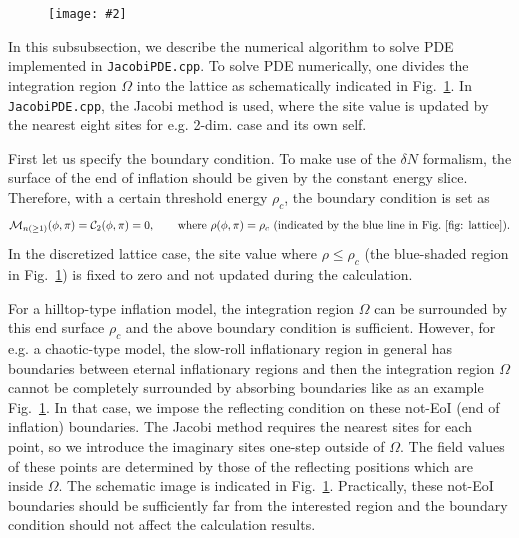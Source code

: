 \documentclass[aps, prd
, preprint
, nofootinbib 
, longbibliography
]{revtex4-1}
\newcommand{\calC}{\mathcal{C}}
\newcommand{\calM}{\mathcal{M}}
\newcommand{\bae}[1]{\begin{align} #1 \end{align}}
\newcommand{\bfe}[4]{
\begin{figure} 
	\centering
	\texttt{[image: \#2]}
	\caption{#3}
	\label{#4}
\end{figure}}
\begin{document}
\bfe{width=\hsize}{figs/lattice.pdf}{}{fig: lattice}

In this subsubsection, we describe the numerical algorithm to solve PDE implemented in \texttt{JacobiPDE.cpp}.
To solve PDE numerically, one divides the integration region $\Omega$ into the lattice as schematically indicated in Fig.~\ref{fig: lattice}.
In \texttt{JacobiPDE.cpp}, the Jacobi method is used, where the site value is updated by the nearest eight sites for e.g. 2-dim. case and its own self.

First let us specify the boundary condition. To make use of the $\delta N$ formalism, the surface of the end of inflation should be given by the constant energy slice.
Therefore, with a certain threshold energy $\rho_c$, the boundary condition is set as
\bae{
	\calM_{n(\ge1)}(\phi,\pi)=\calC_2(\phi,\pi)=0, \qquad \text{where $\rho(\phi,\pi)=\rho_c$ (indicated by the blue line in Fig.~\ref{fig: lattice})}.
}
In the discretized lattice case, the site value where $\rho\le\rho_c$ (the blue-shaded region in Fig.~\ref{fig: lattice}) is fixed to zero and not updated during the calculation.

For a hilltop-type inflation model, the integration region $\Omega$ can be surrounded by this end surface $\rho_c$ and the above boundary condition is sufficient.
However, for e.g. a chaotic-type model, the slow-roll inflationary region in general has boundaries between eternal inflationary regions and then the integration region 
$\Omega$ cannot be completely surrounded by absorbing boundaries like as an example Fig.~\ref{fig: lattice}.
In that case, we impose the reflecting condition on these not-EoI (end of inflation) boundaries. 
The Jacobi method requires the nearest sites for each point, so we introduce the imaginary sites one-step outside of $\Omega$.
The field values of these points are determined by those of the reflecting positions which are inside $\Omega$.
The schematic image is indicated in Fig.~\ref{fig: lattice}. Practically, these not-EoI boundaries should be sufficiently far from the interested region
and the boundary condition should not affect the calculation results.
\end{document}
